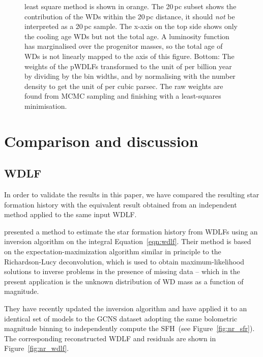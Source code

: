 \documentclass[fleqn,usenatbib]{mnras}
\begin{document}
\begin{figure}
{    least square method is shown in orange. The 20\,pc subset shows the
    contribution of the WDs within the 20\,pc distance, it should \textit{not}
    be interpreted as a 20\,pc sample. The x-axis on the top side shows only the
    cooling age WDs but not the total age. A luminosity function has
    marginalised over the progenitor masses, so the total age of WDs is not
    linearly mapped to the axis of this figure. Bottom: The weights of the
    pWDLFs transformed to the unit of per billion year by dividing by the bin
    widths, and by normalising with the number density to get the unit of per
    cubic parsec. The raw weights are found from MCMC sampling and finishing
    with a least-squares minimisation.}
    \label{fig:sfh_optimal}
\end{figure}


\section{Comparison and discussion}
\label{sec:comparison}

\subsection{WDLF}
\label{sec:inversion}
In order to validate the results in this paper, we have compared the
resulting star formation history with the equivalent result obtained from an
independent method applied to the same input WDLF.

\citet{2013MNRAS.434.1549R} presented a method to estimate the star formation
history from WDLFs using an inversion algorithm on the integral 
Equation~\ref{eqn:wdlf}. Their method is based on the expectation-maximization
algorithm similar in principle to the Richardson-Lucy deconvolution, which is
used to obtain maximum-likelihood solutions to inverse problems in the presence 
of missing data -- which in the present application is the unknown distribution
of WD mass as a function of magnitude.

They have recently updated the inversion algorithm and have applied it to an
identical set of models to the GCNS dataset adopting the same bolometric
magnitude binning to independently compute the SFH~(see Figure~\ref{fig:nr_sfr}).
The corresponding reconstructed WDLF and residuals are shown in
Figure~\ref{fig:nr_wdlf}.
\end{document}
